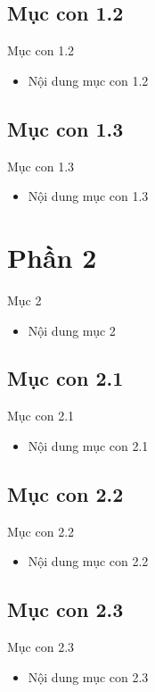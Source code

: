 \documentclass{beamer}
\begin{document}
\subsection{Mục con 1.2}
\begin{frame}{Mục con 1.2}
\begin{itemize}
\item Nội dung mục con 1.2
\end{itemize}
\end{frame}

\subsection{Mục con 1.3}
\begin{frame}{Mục con 1.3}
\begin{itemize}
\item Nội dung mục con 1.3
\end{itemize}
\end{frame}

\section{Phần 2}
\begin{frame}{Mục 2}
\begin{itemize}
\item Nội dung mục 2
\end{itemize}
\end{frame}

\subsection{Mục con 2.1}
\begin{frame}{Mục con 2.1}
\begin{itemize}
\item Nội dung mục con 2.1
\end{itemize}
\end{frame}

\subsection{Mục con 2.2}
\begin{frame}{Mục con 2.2}
\begin{itemize}
\item Nội dung mục con 2.2
\end{itemize}
\end{frame}

\subsection{Mục con 2.3}
\begin{frame}{Mục con 2.3}
\begin{itemize}
\item Nội dung mục con 2.3
\end{itemize}
\end{frame}
\end{document}
